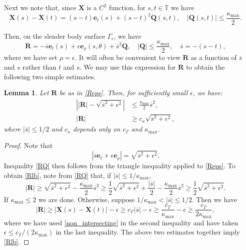 \documentclass[11pt]{article}
\numberwithin{equation}{section}
\newcommand{\T}{\mathbb{T}}
\newcommand{\bars}{\overline s}
\newcommand{\X}{\bm{X}}
\newcommand{\be}{\bm{e}}
\newcommand{\abs}[1]{\left\lvert #1 \right\rvert}
\newtheorem{lemma}[theorem]{Lemma}
\theoremstyle{definition}
\begin{document}
Next we note that, since $\X$ is a $C^2$ function, for $s,t\in \T$ we have
\begin{equation}\label{CQ}
\X(s)-\X(t)=(s-t)\be_t(s)+(s-t)^2\bm{Q}(s,t), \quad \abs{\bm{Q}(s,t)}\le \frac{\kappa_{\max}}{2}.
\end{equation}

Then, on the slender body surface $\Gamma_{\epsilon}$, we have 
\begin{equation}\label{Reps}
\bm{R}=-\bars \be_t(s)+\epsilon \be_\rho(s,\theta)+ \bars^2\bm{Q}, \quad \abs{\bm{Q}}\le \frac{\kappa_{\max}}{2}, \quad \bars = -(s-t),
\end{equation}
where we have set $\rho=\epsilon$. It will often be convenient to view $\bm{R}$ as a function of $\bars$ and $s$ rather than $t$ and $s$. We may use this expression for $\bm{R}$ to obtain the following two simple estimates.
\begin{lemma}\label{absRests}
Let $\bm{R}$ be as in \eqref{Reps}. Then, for sufficiently small $\epsilon$, we have:
\begin{align}
\label{RQ}
\abs{\abs{\bm{R}}-\sqrt{\bars^2+\epsilon^2}}&\le \frac{\kappa_{\max}}{2} \bars^2,\\
\label{Rlb}
\abs{\bm{R}}&\ge c_\kappa\sqrt{\bars^2+\epsilon^2},
\end{align}
where $\abs{\bars}\leq 1/2$ and $c_\kappa$ depends only on $c_\Gamma$ and $\kappa_{\max}$.
\end{lemma}

\begin{proof}
Note that
\begin{equation}
\abs{\bars \be_t +\epsilon\be_\rho}=\sqrt{\bars^2+\epsilon^2}.
\end{equation}
Inequality \eqref{RQ} then follows from the triangle inequality applied to \eqref{Reps}. To obtain \eqref{Rlb}, note from \eqref{RQ} that, if $\abs{\bars}\le 1/\kappa_{\max}$,
\[\abs{\bm{R}}\ge \sqrt{\bars^2+\epsilon^2}- \frac{\kappa_{\max}}{2}\bars^2\ge \frac{1}{2}\sqrt{\bars^2+\epsilon^2}
+\frac{\abs{\bars}}{2}- \frac{\kappa_{\max}}{2}\bars^2\ge \frac{1}{2}\sqrt{\bars^2+\epsilon^2}.\]
If $\kappa_{\max}\le 2$ we are done. Otherwise, suppose $1/\kappa_{\max}<\abs{\bars}\le 1/2$. Then we have
\begin{equation}
\abs{\bm{R}}\ge \abs{\bm{X}(s)-\bm{X}(t)}-\epsilon \ge c_\Gamma |\bars| -\epsilon\ge  
\frac{c_\Gamma}{\kappa_{\max}}-\epsilon\ge \frac{c_\Gamma}{2\kappa_{\max}},
\end{equation}
where we have used \eqref{non_intersecting} in the second inequality and have taken $\epsilon\le c_\Gamma/(2\kappa_{\max})$ in the last inequality. The above two estimates together imply \eqref{Rlb}.
\end{proof}
\end{document}
